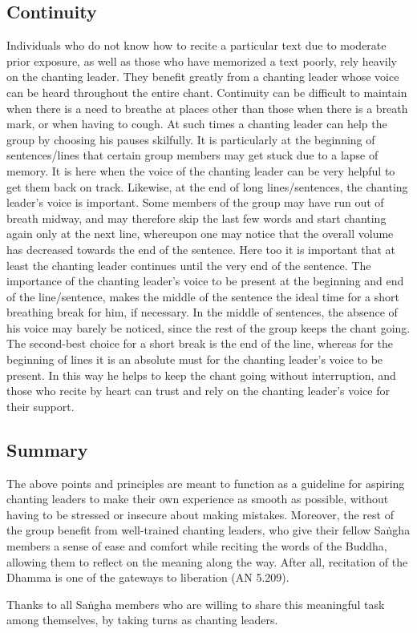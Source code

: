 \subsection*{Continuity}
\begin{justify}
  Individuals who do not know how to recite a particular text due to moderate prior exposure, as well as those who have memorized a text poorly, rely heavily on the chanting leader. They benefit greatly from a chanting leader whose voice can be heard throughout the entire chant. Continuity can be difficult to maintain when there is a need to breathe at places other than those when there is a breath mark, or when having to cough. At such times a chanting leader can help the group by choosing his pauses skilfully. It is particularly at the beginning of sentences/lines that certain group members may get stuck due to a lapse of memory. It is here when the voice of the chanting leader can be very helpful to get them back on track. Likewise, at the end of long lines/sentences, the chanting leader's voice is important. Some members of the group may have run out of breath midway, and may therefore skip the last few words and start chanting again only at the next line, whereupon one may notice that the overall volume has decreased towards the end of the sentence. Here too it is important that at least the chanting leader continues until the very end of the sentence. The importance of the chanting leader's voice to be present at the beginning and end of the line/sentence, makes the middle of the sentence the ideal time for a short breathing break for him, if necessary. In the middle of sentences, the absence of his voice may barely be noticed, since the rest of the group keeps the chant going. The second-best choice for a short break is the end of the line, whereas for the beginning of lines it is an absolute must for the chanting leader's voice to be present. In this way he helps to keep the chant going without interruption, and those who recite by heart can trust and rely on the chanting leader's voice for their support.
\end{justify}

\subsection*{Summary}
\begin{justify}
  The above points and principles are meant to function as a guideline for aspiring chanting leaders to make their own experience as smooth as possible, without having to be stressed or insecure about making mistakes. Moreover, the rest of the group benefit from well-trained chanting leaders, who give their fellow Saṅgha members a sense of ease and comfort while reciting the words of the Buddha, allowing them to reflect on the meaning along the way. After all, recitation of the Dhamma is one of the gateways to liberation (AN 5.209).
\end{justify}

\begin{justify}
  Thanks to all Saṅgha members who are willing to share this meaningful task among themselves, by taking turns as chanting leaders.
\end{justify}
